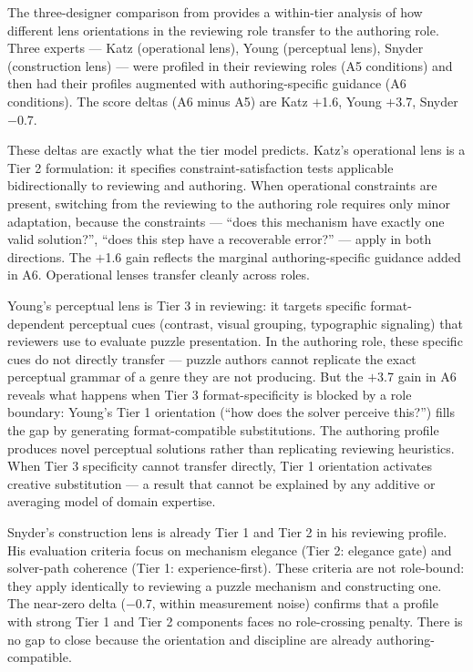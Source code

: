 The three-designer comparison from \citeauthor{paper3} \cite{paper3} provides a within-tier
analysis of how different lens orientations in the reviewing role transfer to the
authoring role. Three experts --- Katz (operational lens), Young (perceptual lens),
Snyder (construction lens) --- were profiled in their reviewing roles (A5 conditions) and
then had their profiles augmented with authoring-specific guidance (A6 conditions). The
score deltas (A6 minus A5) are Katz $+$1.6, Young $+$3.7, Snyder $-$0.7.

These deltas are exactly what the tier model predicts. Katz's operational lens is a Tier
2 formulation: it specifies constraint-satisfaction tests applicable bidirectionally to
reviewing and authoring. When operational constraints are present, switching from the
reviewing to the authoring role requires only minor adaptation, because the constraints
--- ``does this mechanism have exactly one valid solution?'', ``does this step have a
recoverable error?'' --- apply in both directions. The $+$1.6 gain reflects the marginal
authoring-specific guidance added in A6. Operational lenses transfer cleanly across
roles.

Young's perceptual lens is Tier 3 in reviewing: it targets specific format-dependent
perceptual cues (contrast, visual grouping, typographic signaling) that reviewers use to
evaluate puzzle presentation. In the authoring role, these specific cues do not directly
transfer --- puzzle authors cannot replicate the exact perceptual grammar of a genre they
are not producing. But the $+$3.7 gain in A6 reveals what happens when Tier 3
format-specificity is blocked by a role boundary: Young's Tier 1 orientation (``how does
the solver perceive this?'') fills the gap by generating format-compatible substitutions.
The authoring profile produces novel perceptual solutions rather than replicating
reviewing heuristics. When Tier 3 specificity cannot transfer directly, Tier 1 orientation
activates creative substitution --- a result that cannot be explained by any additive or
averaging model of domain expertise.

Snyder's construction lens is already Tier 1 and Tier 2 in his reviewing profile. His
evaluation criteria focus on mechanism elegance (Tier 2: elegance gate) and solver-path
coherence (Tier 1: experience-first). These criteria are not role-bound: they apply
identically to reviewing a puzzle mechanism and constructing one. The near-zero delta
($-$0.7, within measurement noise) confirms that a profile with strong Tier 1 and Tier 2
components faces no role-crossing penalty. There is no gap to close because the
orientation and discipline are already authoring-compatible.

